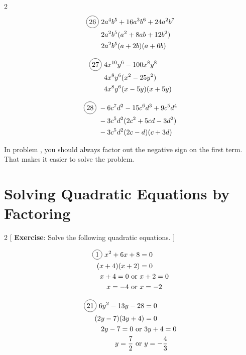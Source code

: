 \begin{multicols}{2}
\begin{align*}
  \circled{26}\ &2a^{4}b^{5}+16a^{3}b^{6}+24a^{2}b^{7}\\
  &2a^{2}b^{5}(a^{2}+8ab+12b^{2})\\
  &2a^{2}b^{5}(a+2b)(a+6b)\\
\end{align*}

\begin{align*}
  \circled{27}\ &4x^{10}y^{6}-100x^{8}y^{8}\\
  &4x^{8}y^{6}(x^{2}-25y^{2})\\
  &4x^{8}y^{6}(x-5y)(x+5y)\\
\end{align*}

\begin{align*}
  \circled{28}\ &-6c^{7}d^{2}-15c^{6}d^{3}+9c^{5}d^{4}\\
  &-3c^{5}d^{2}(2c^{2}+5cd-3d^{2})\\
  &-3c^{5}d^{2}(2c-d)(c+3d)\\
\end{align*}
\end{multicols}

In problem , you should always factor out the negative sign on the first term. That makes it easier to solve the problem.

\section{Solving Quadratic Equations by Factoring}

\begin{multicols}{2}
[
  \textbf{Exercise}: Solve the following quadratic equations.
]

\begin{align*}
  \circled{1}\ x^{2}+6x+8&=0\\
  (x+4)(x+2)&=0\\
  x+4=0 \text{ or }&x+2=0\\
  x=-4 \text{ or }&x=-2
\end{align*}

\begin{align*}
  \circled{21}\ 6y^{2}-13y-28&=0\\
  (2y-7)(3y+4)&=0\\
  2y-7=0 \text{ or }&3y+4=0\\
  y=\frac{7}{2} \text{ or }&y=-\frac{4}{3}
\end{align*}
\end{multicols}

